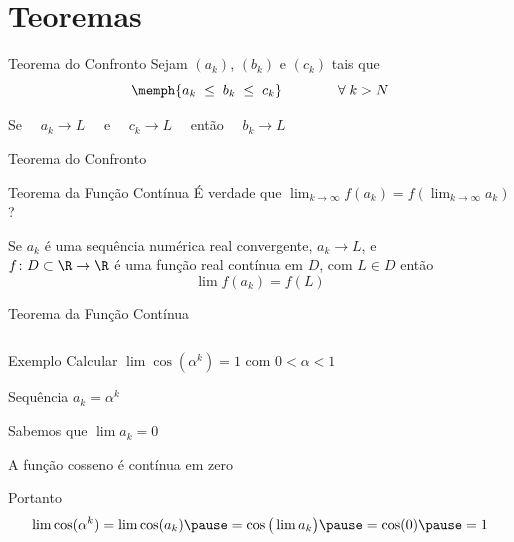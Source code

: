 \section{Teoremas}

\begin{frame}{Teorema do Confronto}
  Sejam $(a_k)$, $(b_k)$ e $(c_k)$ tais que
  \[
   	\memph{a_k \;\leq\; b_k \;\leq\; c_k} \qquad\qquad \forall\; k > N
 	\]

	\pause
  \vspace{\baselineskip}
  Se $\quad a_k\to L\quad$ e $\quad c_k\to L\quad$ então $\quad b_k\to L$
\end{frame}


\begin{frame}{Teorema do Confronto}
  \centering
  \scalebox{1}{}
\end{frame}

\begin{frame}{Teorema da Função Contínua}
É verdade que \quad
\emph{\(
  \lim_{k\to \infty} f(a_k) = f\!\left(\lim_{k\to \infty} a_k\right)
\)} \quad?

\pause
\vspace{2\baselineskip}
Se $a_k$ é uma sequência numérica real convergente, $a_k\to L$, e\\[1mm]
$f\colon D\subset\R\to\R$ é uma função real contínua em $D$,
com $L\in D$
então
\[
  \lim f(a_k) = f(L)
\]
\end{frame}

\begin{frame}{Teorema da Função Contínua}
  \begin{columns}
    \centerline{\scalebox{0.8}{}} \pause
    \centerline{\scalebox{0.8}{}}
  \end{columns}
\end{frame}

\begin{frame}{Exemplo}
  Calcular \(\lim\cos(\alpha^k)=1\) com $0<\alpha<1$

  \pause
  \vspace{\baselineskip}
  \qquad Sequência \( a_k = \alpha^k\)

  \qquad Sabemos que \(\lim a_k=0\)

  \pause
  \qquad A função cosseno é contínua em zero

  \pause
  \vspace{0.5\baselineskip}
  Portanto
  \[
    \lim\cos(\alpha^k)
    = \lim\cos(a_k)
    \pause
    = \cos\big(\lim a_k\big)
    \pause
    = \cos(0)
    \pause
    = 1
  \]
\end{frame}

